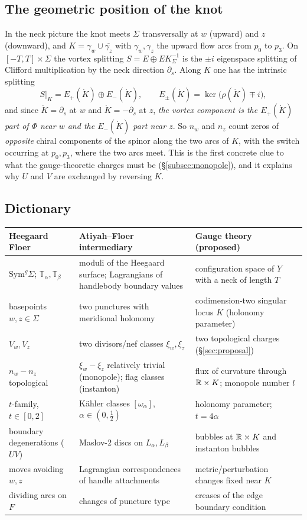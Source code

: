 \subsection{The geometric position of the knot}
In the neck picture the knot meets $\Sigma$ transversally at $w$ (upward) and $z$ (downward), and
$K=\gamma_w\cup\overline{\gamma_z}$ with $\gamma_w,\gamma_z$ the upward flow arcs from $p_0$ to $p_3$.
On $[-T,T]\times\Sigma$ the vortex splitting $S=E\oplus EK_\Sigma^{-1}$ is the $\pm i$ eigenspace splitting
of Clifford multiplication by the neck direction $\partial_s$.  Along $K$ one has the intrinsic splitting
\[
S|_K=E_+(\dot K)\oplus E_-(\dot K),\qquad E_\pm(\dot K)=\ker\big(\rho(\dot K)\mp i\big),
\]
and since $\dot K=\partial_s$ at $w$ and $\dot K=-\partial_s$ at $z$, \emph{the vortex component is the
$E_+(\dot K)$ part of $\Phi$ near $w$ and the $E_-(\dot K)$ part near $z$}.  So $n_w$ and $n_z$ count zeros of
\emph{opposite} chiral components of the spinor along the two arcs of $K$, with the switch occurring at
$p_0,p_3$, where the two arcs meet.  This is the first concrete clue to what the gauge-theoretic charges
must be (\S\ref{subsec:monopole}), and it explains why $U$ and $V$ are exchanged by reversing $K$.

\subsection{Dictionary}
\begin{center}
\small
\begin{tabular}{p{4.3cm}p{4.5cm}p{4.9cm}}
\toprule
Heegaard Floer & Atiyah--Floer intermediary & Gauge theory (proposed)\\
\midrule
$\mathrm{Sym}^g\Sigma$; $\mathbb T_\alpha,\mathbb T_\beta$ & moduli of the Heegaard surface; Lagrangians of handlebody boundary values & configuration space of $Y$ with a neck of length $T$\\
basepoints $w,z\in\Sigma$ & two punctures with meridional holonomy & codimension-two singular locus $K$ (holonomy parameter)\\
$V_w,V_z$ & two divisors/nef classes $\xi_w,\xi_z$ & two topological charges (\S\ref{sec:proposal})\\
$n_w-n_z$ topological & $\xi_w-\xi_z$ relatively trivial (monopole); flag classes (instanton) & flux of curvature through $\mathbb{R}\times K$; monopole number $l$\\
$t$-family, $t\in[0,2]$ & Kähler classes $[\omega_\alpha]$, $\alpha\in(0,\tfrac12)$ & holonomy parameter; $t=4\alpha$\\
boundary degenerations ($UV$) & Maslov-$2$ discs on $L_\alpha,L_\beta$ & bubbles at $\mathbb{R}\times K$ and instanton bubbles\\
moves avoiding $w,z$ & Lagrangian correspondences of handle attachments & metric/perturbation changes fixed near $K$\\
dividing arcs on $F$ & changes of puncture type & creases of the edge boundary condition\\
\bottomrule
\end{tabular}
\end{center}
